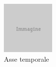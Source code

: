 \begin{figure}[ht]
	\begin{center}
		\includegraphics{placeholder.png}
		\caption{Asse temporale}
		\label{fig:tesi:stage:design:timeline}
	\end{center}
\end{figure}
